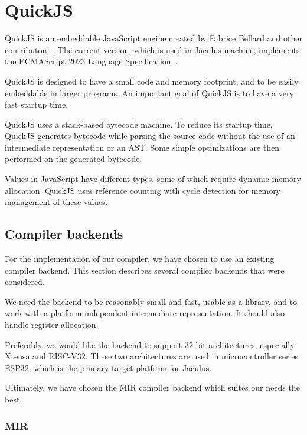 \section{QuickJS}

QuickJS is an embeddable JavaScript engine created by Fabrice Bellard and other contributors~\cite{quickjs}. The current version, which is used in Jaculus-machine, implements the ECMAScript 2023 Language Specification~\cite{ecma262}.

QuickJS is designed to have a small code and memory footprint, and to be easily embeddable in larger programs. An important goal of QuickJS is to have a very fast startup time.

QuickJS uses a stack-based bytecode machine. To reduce its startup time, QuickJS generates bytecode while parsing the source code without the use of an intermediate representation or an AST. Some simple optimizations are then performed on the generated bytecode.

Values in JavaScript have different types, some of which require dynamic memory allocation. QuickJS uses reference counting with cycle detection for memory management of these values.




\subsection{Compiler backends}

For the implementation of our compiler, we have chosen to use an existing compiler backend. This section describes several compiler backends that were considered.

We need the backend to be reasonably small and fast, usable as a library, and to work with a platform independent intermediate representation. It should also handle register allocation.

Preferably, we would like the backend to support 32-bit architectures, especially Xtensa and RISC-V32. These two architectures are used in microcontroller series ESP32, which is the primary target platform for Jaculus.

Ultimately, we have chosen the MIR compiler backend which suites our needs the best.


\subsubsection{MIR}

